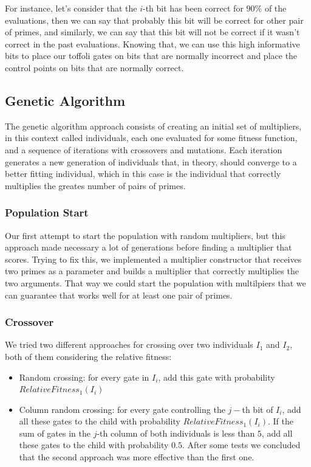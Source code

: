 \documentclass[12pt]{article}
\begin{document}
For instance, let's consider that the $i$-th bit has been correct for $90\%$ of the evaluations, then we can say that probably this bit will be correct for other pair of primes, and similarly, we can say that this bit will not be correct if it wasn't correct in the past evaluations. Knowing that, we can use this high informative bits to place our toffoli gates on bits that are normally incorrect and place the control points on bits that are normally correct.

\subsection{Genetic Algorithm}
The genetic algorithm approach consists of creating an initial set of multipliers, in this context called individuals, each one evaluated for some fitness function, and a sequence of iterations with crossovers and mutations. Each iteration generates a new generation of individuals that, in theory, should converge to a better fitting individual, which in this case is the individual that correctly multiplies the greates number of pairs of primes.

\subsubsection{Population Start}
Our first attempt to start the population with random multipliers, but this approach made necessary a lot of generations before finding a multiplier that scores. Trying to fix this, we implemented a multiplier constructor that receives two primes as a parameter and builds a multiplier that correctly multiplies the two arguments. That way we could start the population with multilpiers that we can guarantee that works well for at least one pair of primes.

\subsubsection{Crossover}
We tried two different approaches for crossing over two individuals $I_1$ and $I_2$, both of them considering the relative fitness:
\begin{itemize}
    \item{Random crossing: for every gate in $I_i$, add this gate with probability $RelativeFitness_1 (I_i)$}
    \item{Column random crossing: for every gate controlling the $j-$th bit of $I_i$, add all these gates to the child with probability $RelativeFitness_1 (I_i)$. If the sum of gates in the $j$-th column of both individuals is less than $5$, add all these gates to the child with probability $0.5$.}
    After some tests we concluded that the second approach was more effective than the first one.
\end{itemize}
\end{document}
